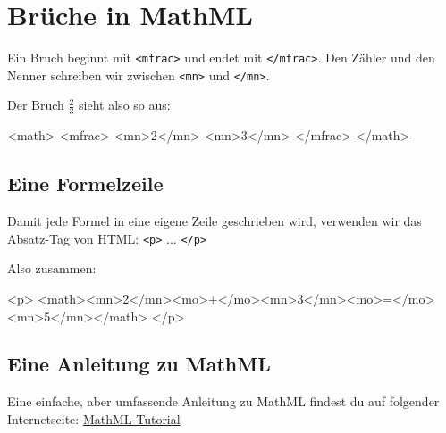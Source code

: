 \pagebreak

\section{Brüche in MathML}

Ein Bruch beginnt mit \texttt{<mfrac>} und endet mit \texttt{</mfrac>}. Den Zähler und den Nenner schreiben wir zwischen \texttt{<mn>} und \texttt{</mn>}.

Der Bruch $\frac{2}{3}$ sieht also so aus:

\begin{codeHTML}
<math>
	<mfrac>
		<mn>2</mn>
		<mn>3</mn>
	</mfrac>
</math>
\end{codeHTML}

\subsection*{Eine Formelzeile}

Damit jede Formel in eine eigene Zeile geschrieben wird, verwenden wir das Absatz-Tag von HTML: \texttt{<p>} ... \texttt{</p>}

Also zusammen:
\begin{codeHTML}
<p>
	<math><mn>2</mn><mo>+</mo><mn>3</mn><mo>=</mo><mn>5</mn></math>
</p>
\end{codeHTML}

\subsection*{Eine Anleitung zu MathML}

Eine einfache, aber umfassende Anleitung zu MathML findest du auf folgender Internetseite: \href{https://www.math-it.de/Publikationen/MathML_de.html}{MathML-Tutorial}